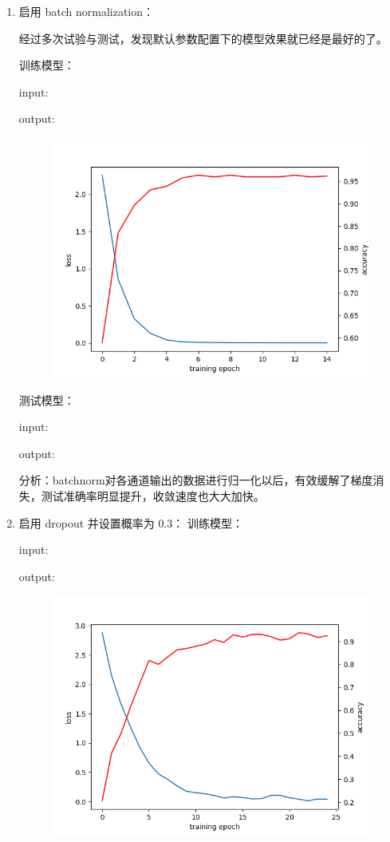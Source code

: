 \documentclass[a4paper]{article}
\begin{document}
\begin{enumerate}
\begin{enumerate}
        \item 启用 batch normalization：
        
        经过多次试验与测试，发现默认参数配置下的模型效果就已经是最好的了。

        训练模型：

        input:
        

        output:
        
        \begin{figure}[H]
            \centering
            \includegraphics[width=0.65\linewidth]{../result/1_2-0.png}
            \caption{}
        \end{figure}

        测试模型：

        input:
        

        output:
        

        分析：batchnorm对各通道输出的数据进行归一化以后，有效缓解了梯度消失，测试准确率明显提升，收敛速度也大大加快。
        \vspace{2em}

        \item 启用 dropout 并设置概率为 0.3：
        训练模型：

        input:
        

        output:
        
        \begin{figure}[H]
            \centering
            \includegraphics[width=0.65\linewidth]{../result/1_3-25epoch.png}
            \caption{}
        \end{figure}


\end{enumerate}
\end{enumerate}
\end{document}
